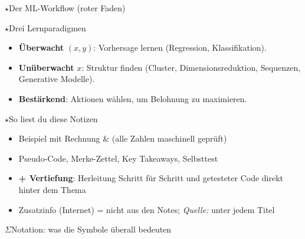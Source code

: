 \begin{hngrid}
\begin{hnp}[raster multicolumn=6,acc=hnnavy]{$\star$}{Der ML-Workflow (roter Faden)}
\end{hnp}
%
\begin{hnp}[raster multicolumn=3,acc=hnpurple]{$\star$}{Drei Lernparadigmen}
\begin{itemize}
\item \textbf{Überwacht} $(x,y)$: Vorhersage lernen (Regression, Klassifikation).
\item \textbf{Unüberwacht} $x$: Struktur finden (Cluster, Dimensionsreduktion, Sequenzen, Generative Modelle).
\item \textbf{Bestärkend}: Aktionen wählen, um Belohnung zu maximieren.
\end{itemize}
\end{hnp}
%
\begin{hnp}[raster multicolumn=3,acc=hngreen]{$\star$}{So liest du diese Notizen}
\begin{itemize}
\item \colorbox{hnmint}{Beispiel} mit Rechnung \& \hnsol{} (alle Zahlen maschinell geprüft)
\item \colorbox{hnblue}{Pseudo-Code}, \colorbox{hnyellow}{Merke-Zettel}, Key Takeaways, \colorbox{hnlilac}{Selbsttest}
\item \textbf{+ Vertiefung}: Herleitung Schritt für Schritt und getesteter Code direkt hinter dem Thema
\item \colorbox{hnorange!20}{Zusatzinfo (Internet)} = nicht aus den Notes; \emph{Quelle:} unter jedem Titel
\end{itemize}
\end{hnp}
%
\begin{hnp}[raster multicolumn=6,acc=hnnavy]{$\Sigma$}{Notation: was die Symbole überall bedeuten}
\hnsmall\raggedright

\end{hnp}
\end{hngrid}
